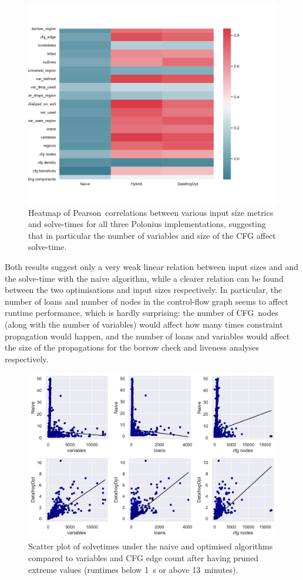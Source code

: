 \documentclass[11pt,a4paper,twoside,openany]{report}
\begin{document}
\begin{figure}
  \includegraphics[width=0.9\linewidth]{Graphs/corr_heatmap.pdf}
  \caption{Heatmap of Pearson~correlations between various input size metrics
    and solve-times for all three Polonius implementations, suggesting that in
    particular the number of variables and size of the CFG affect solve-time.}
  \label{fig:corr-heatmap}
\end{figure}

Both results suggest only a very weak linear relation between input sizes and
and the solve-time with the naive algorithm, while a clearer relation can be
found between the two optimisations and input sizes respectively. In particular,
the number of loans and number of nodes in the control-flow graph seems to
affect runtime performance, which is hardly surprising: the number of CFG~nodes
(along with the number of variables) would affect how many times constraint
propagation would happen, and the number of loans and variables would affect the
size of the propagations for the borrow check and liveness analyses
respectively.

\begin{figure}
  \includegraphics[width=0.9\linewidth]{Graphs/corr_scatter.pdf}
  \caption{Scatter plot of solvetimes under the naive and optimised algorithms
    compared to variables and CFG edge count after having pruned extreme values
    (runtimes below 1~s or above 13~minutes).}
  \label{fig:input-scatter}
\end{figure}
\end{document}
